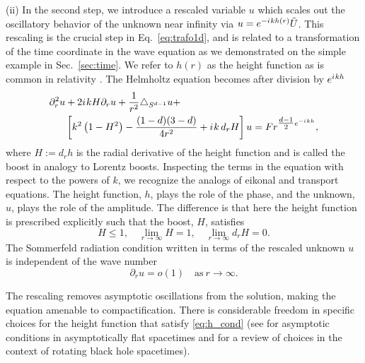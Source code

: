 \documentclass[draft,onefignum,onetabnum]{siamart190516}
\newcommand{\iu}{{i\mkern1mu}}
\begin{document}
(ii) In the second step, we introduce a rescaled variable $u$ which scales out the oscillatory behavior of the unknown near infinity via $u=e^{-\iu k h(r)} \tilde{U}$. This rescaling is the crucial step in Eq.~\eqref{eq:trafo1d}, and is related to a transformation of the time coordinate in the wave equation \cite{ZengFramework} as we demonstrated on the simple example in Sec.~\ref{sec:time}. We refer to $h(r)$ as the height function as is common in relativity \cite{reinhart1973maximal, beig1996vacuum}. The Helmholtz equation becomes after division by $e^{\iu k h}$
\begin{align*}
	\partial_r^2 u & + 2 \iu k H \partial_r u + \frac{1}{r^2}\triangle_{S^{d-1}} u +                                        \\
	        & \left[k^2 \left(1- H^2\right) - \frac{(1-d)(3-d)}{4 r^2} + \iu k \, d_r H \right] u = F r^{\tfrac{d-1}{2} e^{-\iu k h}},
\end{align*}
where $H:=d_r h$ is the radial derivative of the height function and is called the boost in analogy to Lorentz boosts. Inspecting the terms in the equation with respect to the powers of $k$, we recognize the analogs of eikonal and transport equations. The height function, $h$, plays the role of the phase, and the unknown, $u$, plays the role of the amplitude. The difference is that here the height function is prescribed explicitly such that the boost, $H$, satisfies \cite{Zenginoglu08, ZengFramework, jaramillo2021pseudospectrum}
\begin{equation}
	H \leq 1, \quad \lim_{r\to\infty} H = 1, \quad \lim_{r\to\infty} d_r H = 0. %
\end{equation}
The Sommerfeld radiation condition written in terms of the rescaled unknown $u$ is independent of the wave number
\[ \partial_r u = o(1) \quad \mathrm{as} \ r\to\infty. \]

The rescaling removes asymptotic oscillations from the solution, making the equation amenable to compactification. There is considerable freedom in specific choices for the height function that satisfy \eqref{eq:h_cond} (see \cite{Zenginoglu08} for asymptotic conditions in asymptotically flat spacetimes and \cite{Macedo_2020} for a review of choices in the context of rotating black hole spacetimes). 
\end{document}
